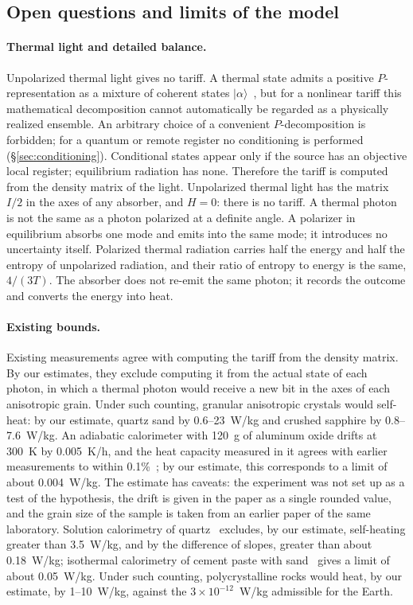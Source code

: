 \documentclass[11pt,a4paper]{article}
\newcommand{\Sref}[1]{\hyperref[#1]{\S\ref{#1}}}
\begin{document}
\subsection{Open questions and limits of the model}\label{sec:open}

\paragraph{Thermal light and detailed balance.}
Unpolarized thermal light gives no tariff. A thermal state admits a positive $P$-representation as a mixture of coherent states $|\alpha\rangle$~\cite{glauber1963}, but for a nonlinear tariff this mathematical decomposition cannot automatically be regarded as a physically realized ensemble. An arbitrary choice of a convenient $P$-decomposition is forbidden; for a quantum or remote register no conditioning is performed (\Sref{sec:conditioning}). Conditional states appear only if the source has an objective local register; equilibrium radiation has none. Therefore the tariff is computed from the density matrix of the light. Unpolarized thermal light has the matrix $I/2$ in the axes of any absorber, and $H=0$: there is no tariff. A thermal photon is not the same as a photon polarized at a definite angle. A polarizer in equilibrium absorbs one mode and emits into the same mode; it introduces no uncertainty itself. Polarized thermal radiation carries half the energy and half the entropy of unpolarized radiation, and their ratio of entropy to energy is the same, $4/(3T)$. The absorber does not re-emit the same photon; it records the outcome and converts the energy into heat.

\paragraph{Existing bounds.}
Existing measurements agree with computing the tariff from the density matrix. By our estimates, they exclude computing it from the actual state of each photon, in which a thermal photon would receive a new bit in the axes of each anisotropic grain. Under such counting, granular anisotropic crystals would self-heat: by our estimate, quartz sand by 0.6--23~W/kg and crushed sapphire by 0.8--7.6~W/kg. An adiabatic calorimeter with 120~g of aluminum oxide drifts at 300~K by 0.005~K/h, and the heat capacity measured in it agrees with earlier measurements to within 0.1\%~\cite{west1958}; by our estimate, this corresponds to a limit of about 0.004~W/kg. The estimate has caveats: the experiment was not set up as a test of the hypothesis, the drift is given in the paper as a single rounded value, and the grain size of the sample is taken from an earlier paper of the same laboratory. Solution calorimetry of quartz~\cite{kilday1973} excludes, by our estimate, self-heating greater than 3.5~W/kg, and by the difference of slopes, greater than about 0.18~W/kg; isothermal calorimetry of cement paste with sand~\cite{wadso2001} gives a limit of about 0.05~W/kg. Under such counting, polycrystalline rocks would heat, by our estimate, by 1--10~W/kg, against the $3\times10^{-12}$~W/kg admissible for the Earth.
\end{document}
